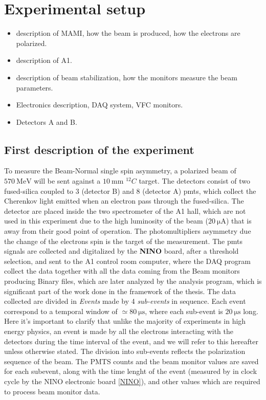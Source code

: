 \chapter{Experimental setup} 
\begin{itemize}
\item description of MAMI, how the beam is produced, how the electrons are polarized.
\item description of A1.
\item description of beam stabilization, how the monitors measure the beam parameters.
\item Electronics description, DAQ system, VFC monitors.
\item Detectors A and B.
\end{itemize}

\section{First description of the experiment} \label{FirstDescription}

To measure the Beam-Normal single spin asymmetry, a polarized beam of $ \SI{570}{\mega \electronvolt}$ will be sent against a $\SI{10}{\milli \meter}$ $^{12}C$ target. The detectors consist of two fused-silica coupled to 3 (detector B) and 8 (detector A) pmts, which collect the Cherenkov light emitted when an electron pass through the fused-silica. 
The detector are placed inside the two spectrometer of the A1 hall, which are not used in this experiment due to the high luminosity of the beam ($ \SI{20}{\micro \ampere}$) that is away from their good point of operation. 
The photomultipliers asymmetry due the change of the electrons spin is the target of the measurement. The pmts signals are collected and digitalized by the \textbf{NINO} board, after a threshold selection, and sent to the A1 control room computer, where the DAQ program collect the data together with all the data coming from the Beam monitors producing Binary files, which are later analyzed by the analysis program, which is significant part of the work done in the framework of the thesis. 
The data collected are divided in \textit{Events} made by 4 \textit{sub-events} in sequence. Each event correspond to a temporal window of $\simeq \SI{80}{\micro \second}$, where each sub-event is $\SI{20}{\micro \second}$ long. Here it's important to clarify that unlike the majority of experiments in high energy physics, an event is made by all the electrons interacting with the detectors during the time interval of the event, and we will refer to this hereafter unless otherwise stated. The division into sub-events reflects the polarization sequence of the beam. The PMTS counts and the beam monitor values are saved for each subevent, along with the time lenght of the event (measured by in clock cycle by the NINO electronic board \ref{NINO}), and other values which are required to process beam monitor data.\\ 

